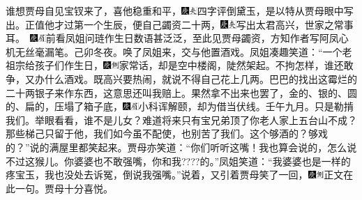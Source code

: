 谁想贾母自见宝钗来了，喜他稳重和平，{\includegraphics[width=3mm]{../Images/00004}\includegraphics[width=3mm]{../Images/00012}\footnotesize \kaishu 四字评倒黛玉，是以特从贾母眼中写出。}正值他才过第一个生辰，便自己蠲资二十两，{\includegraphics[width=3mm]{../Images/00004}\includegraphics[width=3mm]{../Images/00012}\footnotesize \kaishu 写出太君高兴，世家之常事耳。　{\includegraphics[width=3mm]{../Images/00004}\includegraphics[width=3mm]{../Images/00010}\footnotesize \kaishu 前看凤姐问琏作生日数语甚泛泛，至此见贾母蠲资，方知作者写阿凤心机无丝毫漏笔。己卯冬夜。}}唤了凤姐来，交与他置酒戏。凤姐凑趣笑道：``一个老祖宗给孩子们作生日，{\includegraphics[width=3mm]{../Images/00004}\includegraphics[width=3mm]{../Images/00011}\footnotesize \kaishu 家常话，却是空中楼阁，陡然架起。}不拘怎样，谁还敢争，又办什么酒戏。既高兴要热闹，就说不得自己花上几两。巴巴的找出这霉烂的二十两银子来作东西，这意思还叫我赔上。果然拿不出来也罢了，金的、银的、圆的、扁的，压塌了箱子底，{\includegraphics[width=3mm]{../Images/00004}\includegraphics[width=3mm]{../Images/00010}\footnotesize \kaishu 小科诨解颐，却为借当伏线。壬午九月。}只是勒掯我们。举眼看看，谁不是儿女？难道将来只有宝兄弟顶了你老人家上五台山不成？那些梯己只留于他，我们如今虽不配使，也别苦了我们。这个够酒的？够戏的？''说的满屋里都笑起来。贾母亦笑道：``你们听听这嘴！我也算会说的，怎么说不过这猴儿。你婆婆也不敢强嘴，你和我????的。''凤姐笑道：``我婆婆也是一样的疼宝玉，我也没处去诉冤，倒说我强嘴。''说着，又引着贾母笑了一回，{\includegraphics[width=3mm]{../Images/00004}\includegraphics[width=3mm]{../Images/00011}\footnotesize \kaishu 正文在此一句。}贾母十分喜悦。


